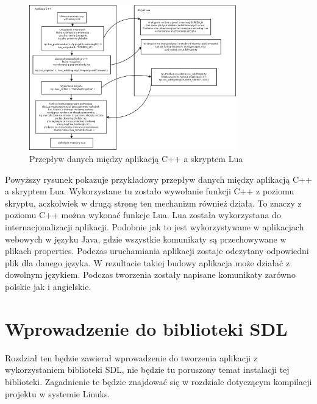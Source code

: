 \begin{figure}[h]
    \centering
    \includegraphics[width=0.8\textwidth,natwidth=410,natheight=142]{./Pictures/lua_skrypty.png}
    \caption{Przepływ danych między aplikacją C++ a skryptem Lua}
\end{figure}

Powyższy rysunek pokazuje przykładowy przepływ danych między aplikacją C++ a skryptem Lua. Wykorzystane tu zostało wywołanie funkcji C++ z poziomu skryptu, aczkolwiek w drugą stronę ten mechanizm również działa. To znaczy z poziomu C++ można wykonać funkcje Lua. Lua została wykorzystana do internacjonalizacji aplikacji. Podobnie jak to jest wykorzystywane w aplikacjach webowych w języku Java, gdzie wszystkie komunikaty są przechowywane w plikach properties. Podczas uruchamiania aplikacji zostaje odczytany odpowiedni plik dla danego języka. W rezultacie takiej budowy aplikacja może działać z dowolnym językiem. Podczas tworzenia zostały napisane komunikaty zarówno polskie jak i angielskie.


\section{Wprowadzenie do biblioteki SDL}
Rozdział ten będzie zawierał wprowadzenie do tworzenia aplikacji z wykorzystaniem biblioteki SDL, nie będzie tu poruszony temat instalacji tej biblioteki. Zagadnienie te będzie znajdować się w rozdziale dotyczącym kompilacji projektu w systemie Linuks. 

